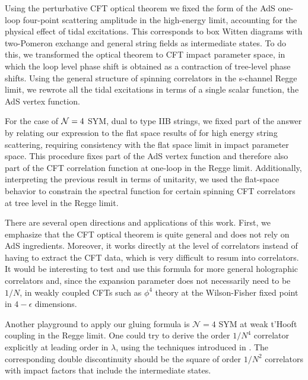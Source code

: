 Using the perturbative CFT optical theorem we fixed the form of the AdS one-loop four-point scattering amplitude in the high-energy limit, accounting for the physical effect of tidal excitations.  This corresponds to box Witten diagrams with two-Pomeron exchange and general string fields as intermediate states. To do this, we transformed the optical theorem to CFT impact parameter space, in which the loop level phase shift is obtained as a contraction of tree-level phase shifts.
Using the general structure of spinning correlators in the s-channel Regge limit, we rewrote all the tidal excitations in terms of a single scalar function, the AdS vertex function.

For the case of ${\cal N}=4$ SYM, dual to type IIB strings, we fixed part of the answer by relating our expression to the flat space results of \cite{Amati:1987wq,Amati:1987uf,Amati:1988tn} for high energy string scattering, requiring consistency with the flat space limit in impact parameter space. This procedure fixes part of the AdS vertex function and therefore also part of the CFT correlation function at one-loop in the Regge limit.
Additionally, interpreting the previous result in terms of unitarity, we used the flat-space behavior  to constrain the spectral function for certain spinning CFT correlators  at tree level in the Regge limit. 


There are several open directions and applications of this work.
First, we emphasize that the CFT optical theorem is quite general and does not rely on AdS ingredients.
Moreover,   it works directly at the level of correlators instead of having to extract the CFT data, which is very difficult to resum into correlators. It would be interesting to test and use this formula for more general holographic correlators and, since the expansion parameter does not necessarily need to be $1/N$, in weakly coupled CFTs such as $\phi^4$ theory at the Wilson-Fisher fixed point in $4-\epsilon$ dimensions. 

Another playground to apply our gluing formula  is $\mathcal{N}=4$ SYM at weak t'Hooft coupling in the Regge limit. One could try to derive the order $1/N^4$ correlator
explicitly  at leading order in $\lambda$, using the techniques introduced in \cite{Cornalba:2008qf}. The corresponding double discontinuity should be the square 
of order  $1/N^2$ correlators with impact factors that include the intermediate states. 

